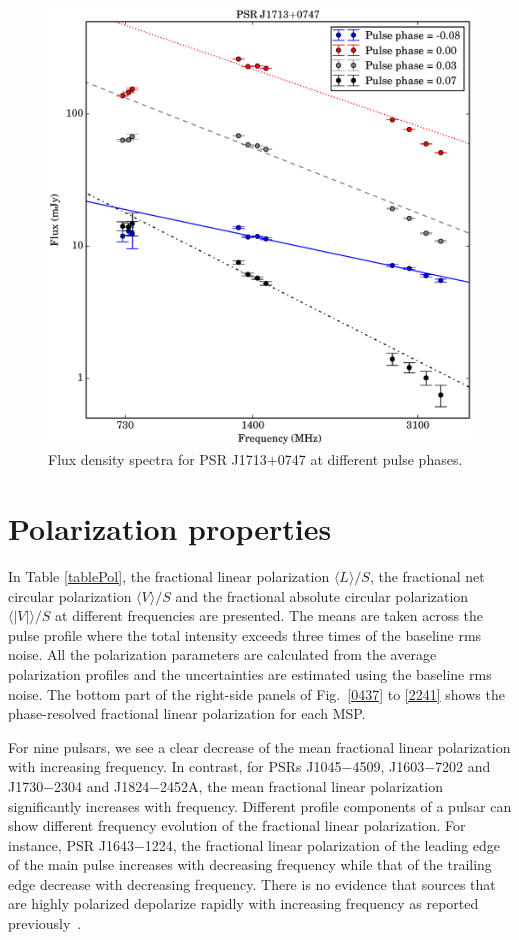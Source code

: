 \documentclass[useAMS,usenatbib]{mn2e}
\begin{document}
\begin{figure}
\begin{center}
\includegraphics[width=3 in]{1713phaseSI.ps}
\caption{Flux density spectra for PSR J1713$+$0747 at different pulse phases.} 
\label{1713SI}
\end{center}
\end{figure}

\section{Polarization properties}

In Table \ref{tablePol}, the fractional linear polarization $\langle L \rangle/S$, 
the fractional net circular polarization $\langle V \rangle/S$ and the fractional absolute 
circular polarization $\langle|V|\rangle/S$ at different frequencies are presented. 
%
The means are taken across the pulse profile where the total intensity exceeds 
three times of the baseline rms noise.
%
All the polarization parameters are calculated from the average polarization 
profiles and the uncertainties are estimated using the baseline rms noise. 
%
%
The bottom part of the right-side panels of Fig.~\ref{0437} to \ref{2241} shows the 
phase-resolved fractional linear polarization for each MSP. 
%

For nine pulsars, we see a clear decrease of the mean fractional linear polarization 
with increasing frequency. In contrast, for PSRs J1045$-$4509, J1603$-$7202 and 
J1730$-$2304 and J1824$-$2452A, the mean fractional linear polarization significantly 
increases with frequency. 
%
Different profile components of a pulsar can show different frequency evolution 
of the fractional linear polarization. For instance, PSR J1643$-$1224, the fractional 
linear polarization of the leading edge of the main pulse increases with decreasing 
frequency while that of the trailing edge decrease with decreasing frequency.
%
There is no evidence that sources that are highly polarized depolarize rapidly 
with increasing frequency as reported previously~\citep{Kramer99}.
%
\end{document}
